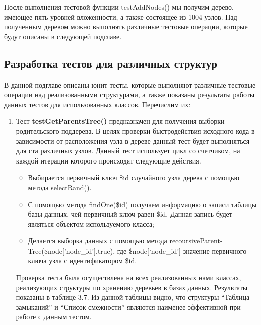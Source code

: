 \documentclass[a4paper,14pt]{extreport}
\theoremstyle{definition}
\begin{document}
После выполнения тестовой функции testAddNodes() мы получим дерево, имеющее пять уровней вложенности, а также состоящее из 1004 узлов. Над полученным деревом можно выполнять различные тестовые операции, которые будут описаны в следующей подглаве.
\subsection{Разработка тестов для различных структур}
В данной подглаве описаны юнит-тесты, которые выполняют различные тестовые операции над реализованными структурами, а также показаны результаты работы данных тестов для использованных классов. Перечислим их:
\begin{enumerate}
\item Тест \textbf{testGetParentsTree()} предназначен для получения выборки родительского поддерева. В целях проверки быстродействия исходного кода в зависимости от расположения узла в дереве данный тест будет выполняться для ста различных узлов. Данный тест использует цикл со счетчиком, на каждой итерации которого происходят следующие действия.
\begin{itemize}
\item Выбирается первичный ключ \$id случайного узла дерева с помощью метода selectRand().
\item С помощью метода findOne(\$id) получаем информацию о записи таблицы базы данных, чей первичный ключ равен \$id. Данная запись будет являться объектом используемого класса;
\item Делается выборка данных с помощью метода recoursiveParent-\\Tree(\$node['node\_id'],true), где \$node[‘node\_id’]-значение первичного ключа узла с идентификатором \$id.
\end{itemize}
Проверка теста была осуществлена на всех реализованных нами классах, реализующих структуры по хранению деревьев в базах данных. Результаты показаны в таблице 3.7. Из данной таблицы видно, что структуры “Таблица замыканий” и “Список смежности” являются наименее эффективной при работе с данным тестом.
\begin{table}[H]
\end{table}
\end{enumerate}
\end{document}
